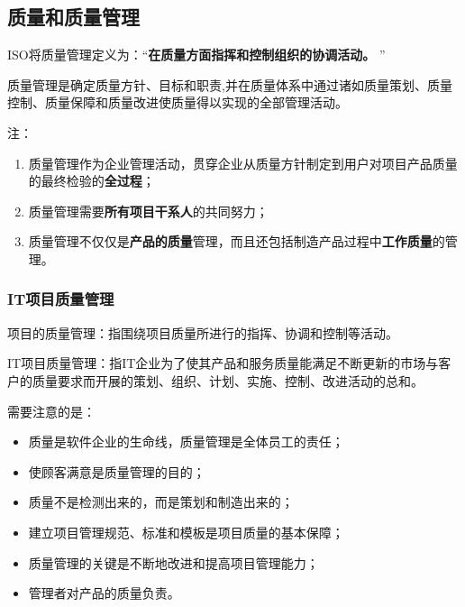 \subsection{质量和质量管理}
ISO将质量管理定义为：“\textbf{在质量方面指挥和控制组织的协调活动。} ”
\par 质量管理是确定质量方针、目标和职责,并在质量体系中通过诸如质量策划、质量控制、质量保障和质量改进使质量得以实现的全部管理活动。
\par 注：
\begin{enumerate}
	\item 质量管理作为企业管理活动，贯穿企业从质量方针制定到用户对项目产品质量的最终检验的\textbf{全过程}；
	\item 质量管理需要\textbf{所有项目干系人}的共同努力；
	\item 质量管理不仅仅是\textbf{产品的质量}管理，而且还包括制造产品过程中\textbf{工作质量}的管理。
\end{enumerate}
\subsubsection{IT项目质量管理}
项目的质量管理：指围绕项目质量所进行的指挥、协调和控制等活动。
\par IT项目质量管理：指IT企业为了使其产品和服务质量能满足不断更新的市场与客户的质量要求而开展的策划、组织、计划、实施、控制、改进活动的总和。
\par 需要注意的是：
\begin{itemize}
	\item 质量是软件企业的生命线，质量管理是全体员工的责任；
	\item 使顾客满意是质量管理的目的；
	\item 质量不是检测出来的，而是策划和制造出来的；
	\item 建立项目管理规范、标准和模板是项目质量的基本保障；
	\item 质量管理的关键是不断地改进和提高项目管理能力；
	\item 管理者对产品的质量负责。
\end{itemize}
